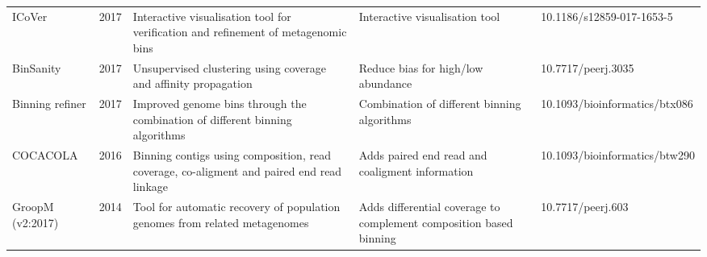 \begin{tabular}{p{2cm}|p{0.6cm}|p{4cm}|p{4cm}|p{3.4cm}}
            ICoVer &  2017 &         Interactive visualisation tool for verification and refinement of metagenomic bins &                                                   Interactive visualisation tool &       10.1186/s12859-017-1653-5 \\
         BinSanity &  2017 &                            Unsupervised clustering using coverage and affinity propagation &                                              Reduce bias for high/low abundance  &              10.7717/peerj.3035 \\
   Binning refiner &  2017 &               Improved genome bins through the combination of different binning algorithms &                                      Combination of different binning algorithms &   10.1093/bioinformatics/btx086 \\
          COCACOLA &  2016 &  Binning contigs using composition, read coverage, co-aligment and paired end read linkage &                                  Adds paired end read and coaligment information &   10.1093/bioinformatics/btw290 \\
  GroopM (v2:2017) &  2014 &                 Tool for automatic recovery of population genomes from related metagenomes &               Adds differential coverage to complement composition based binning &               10.7717/peerj.603 \\
\bottomrule
\end{tabular}
